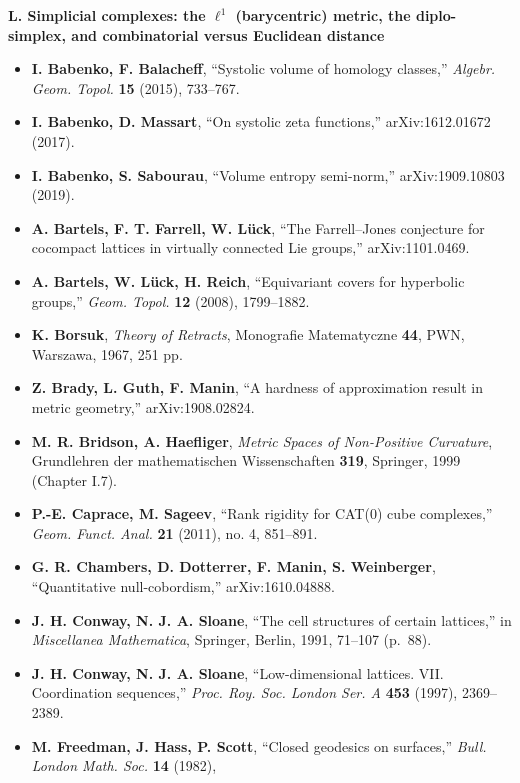 \documentclass[
]{article}
\providecommand{\tightlist}{%
  \setlength{\itemsep}{0pt}\setlength{\parskip}{0pt}}
\begin{document}
\textbf{L. Simplicial complexes: the \(\ell^1\) (barycentric) metric,
the diplo-simplex, and combinatorial versus Euclidean distance}

\begin{itemize}
\tightlist
\item
  \textbf{I. Babenko, F. Balacheff}, ``Systolic volume of homology
  classes,'' \emph{Algebr. Geom. Topol.} \textbf{15} (2015), 733--767.
\item
  \textbf{I. Babenko, D. Massart}, ``On systolic zeta functions,''
  arXiv:1612.01672 (2017).
\item
  \textbf{I. Babenko, S. Sabourau}, ``Volume entropy semi-norm,''
  arXiv:1909.10803 (2019).
\item
  \textbf{A. Bartels, F. T. Farrell, W. L\"{u}ck}, ``The Farrell--Jones
  conjecture for cocompact lattices in virtually connected Lie groups,''
  arXiv:1101.0469.
\item
  \textbf{A. Bartels, W. L\"{u}ck, H. Reich}, ``Equivariant covers for
  hyperbolic groups,'' \emph{Geom. Topol.} \textbf{12} (2008),
  1799--1882.
\item
  \textbf{K. Borsuk}, \emph{Theory of Retracts}, Monografie Matematyczne
  \textbf{44}, PWN, Warszawa, 1967, 251 pp.
\item
  \textbf{Z. Brady, L. Guth, F. Manin}, ``A hardness of approximation
  result in metric geometry,'' arXiv:1908.02824.
\item
  \textbf{M. R. Bridson, A. Haefliger}, \emph{Metric Spaces of
  Non-Positive Curvature}, Grundlehren der mathematischen Wissenschaften
  \textbf{319}, Springer, 1999 (Chapter I.7).
\item
  \textbf{P.-E. Caprace, M. Sageev}, ``Rank rigidity for CAT(0) cube
  complexes,'' \emph{Geom. Funct. Anal.} \textbf{21} (2011), no. 4,
  851--891.
\item
  \textbf{G. R. Chambers, D. Dotterrer, F. Manin, S. Weinberger},
  ``Quantitative null-cobordism,'' arXiv:1610.04888.
\item
  \textbf{J. H. Conway, N. J. A. Sloane}, ``The cell structures of
  certain lattices,'' in \emph{Miscellanea Mathematica}, Springer,
  Berlin, 1991, 71--107 (p.~88).
\item
  \textbf{J. H. Conway, N. J. A. Sloane}, ``Low-dimensional lattices.
  VII. Coordination sequences,'' \emph{Proc. Roy. Soc. London Ser. A}
  \textbf{453} (1997), 2369--2389.
\item
  \textbf{M. Freedman, J. Hass, P. Scott}, ``Closed geodesics on
  surfaces,'' \emph{Bull. London Math. Soc.} \textbf{14} (1982),

\end{itemize}
\end{document}
